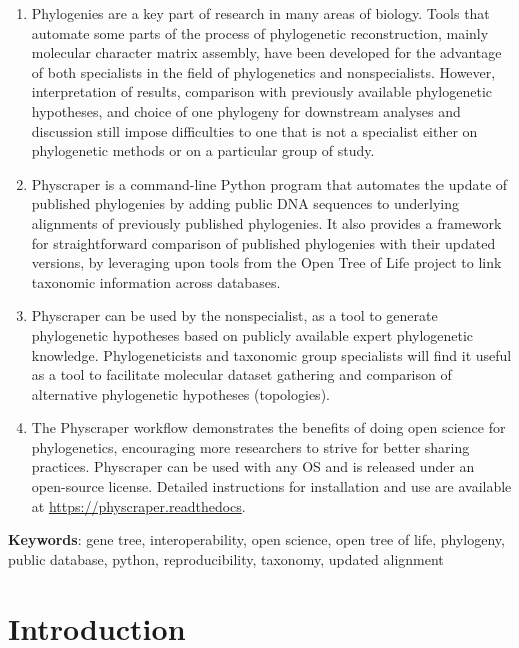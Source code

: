 \documentclass[]{article}
\begin{document}
\begin{enumerate}
\def\labelenumi{\arabic{enumi}.}
\item
  Phylogenies are a key part of research in many areas of biology. Tools that automate
  some parts of the process of phylogenetic reconstruction, mainly molecular character matrix assembly,
  have been developed for the advantage of both specialists in the field of phylogenetics and nonspecialists.
  However, interpretation of results, comparison with previously available phylogenetic
  hypotheses, and choice of one phylogeny for downstream analyses and discussion still impose difficulties
  to one that is not a specialist either on phylogenetic methods or on a particular group of study.
\item
  Physcraper is a command-line Python program that automates the update of published
  phylogenies by adding public DNA sequences to underlying alignments of previously published phylogenies. It also provides a framework for straightforward comparison of published phylogenies with their updated versions, by leveraging upon tools from the Open Tree of Life project to link taxonomic information across databases.
\item
  Physcraper can be used by the nonspecialist, as a tool to generate phylogenetic
  hypotheses based on publicly available expert phylogenetic knowledge.
  Phylogeneticists and taxonomic group specialists will find it useful as a tool to facilitate molecular dataset gathering and comparison
  of alternative phylogenetic hypotheses (topologies).
\item
  The Physcraper workflow demonstrates the benefits of doing open science for phylogenetics, encouraging more researchers to strive for better sharing practices. Physcraper can be used with any OS and is released under an open-source license. Detailed instructions for installation and
  use are available at \href{https://physcraper.readthedocs.io}{https://physcraper.readthedocs}.
\end{enumerate}

\textbf{Keywords}: gene tree, interoperability, open science, open tree of life, phylogeny, public database, python, reproducibility, taxonomy, updated alignment

\newpage

\hypertarget{introduction}{%
\section{Introduction}\label{introduction}}
\end{document}
